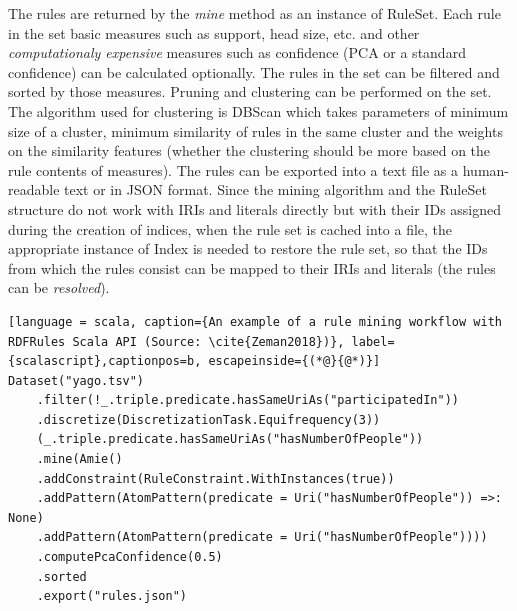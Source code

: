 
The rules are returned by the \textit{mine} method as an instance of RuleSet. Each rule in the set basic measures such as support, head size, etc. and other \textit{computationaly expensive} measures such as confidence (PCA or a standard confidence) can be calculated optionally. The rules in the set can be filtered and sorted by those measures. Pruning and clustering can be performed on the set. The algorithm used for clustering is DBScan which takes parameters of minimum size of a cluster, minimum similarity of rules in the same cluster and the weights on the similarity features (whether the clustering should be more based on the rule contents of measures). The rules can be exported into a text file as a human-readable text or in JSON format. Since the mining algorithm and the RuleSet structure do not work with IRIs and literals directly but with their IDs assigned during the creation of indices, when the rule set is cached into a file, the appropriate instance of Index is needed to restore the rule set, so that the IDs from which the rules consist can be mapped to their IRIs and literals (the rules can be \textit{resolved}).

\begin{lstlisting}[language = scala, caption={An example of a rule mining workflow with RDFRules Scala API (Source: \cite{Zeman2018})}, label={scalascript},captionpos=b, escapeinside={(*@}{@*)}]
Dataset("yago.tsv")
    .filter(!_.triple.predicate.hasSameUriAs("participatedIn"))
    .discretize(DiscretizationTask.Equifrequency(3))
    (_.triple.predicate.hasSameUriAs("hasNumberOfPeople"))
    .mine(Amie()
    .addConstraint(RuleConstraint.WithInstances(true))
    .addPattern(AtomPattern(predicate = Uri("hasNumberOfPeople")) =>: None)
    .addPattern(AtomPattern(predicate = Uri("hasNumberOfPeople"))))
    .computePcaConfidence(0.5)
    .sorted
    .export("rules.json")
\end{lstlisting}
